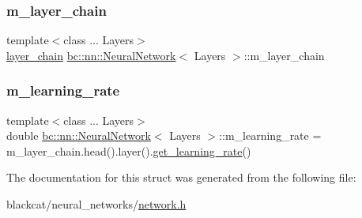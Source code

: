 \mbox{\label{structbc_1_1nn_1_1NeuralNetwork_ac53f5c966286089bcf3944374bcabe03}} 
\subsubsection{\texorpdfstring{m\+\_\+layer\+\_\+chain}{m\_layer\_chain}}
{\footnotesize\ttfamily template$<$class ... Layers$>$ \\
\hyperlink{structbc_1_1nn_1_1NeuralNetwork_aa313d17911ed2cfaa9355c2f7a9f6846}{layer\+\_\+chain} \hyperlink{structbc_1_1nn_1_1NeuralNetwork}{bc\+::nn\+::\+Neural\+Network}$<$ Layers $>$\+::m\+\_\+layer\+\_\+chain}

\mbox{\label{structbc_1_1nn_1_1NeuralNetwork_ac2241797a01d34bca13068d9329fd8fe}} 
\subsubsection{\texorpdfstring{m\+\_\+learning\+\_\+rate}{m\_learning\_rate}}
{\footnotesize\ttfamily template$<$class ... Layers$>$ \\
double \hyperlink{structbc_1_1nn_1_1NeuralNetwork}{bc\+::nn\+::\+Neural\+Network}$<$ Layers $>$\+::m\+\_\+learning\+\_\+rate = m\+\_\+layer\+\_\+chain.\+head().layer().\hyperlink{structbc_1_1nn_1_1NeuralNetwork_a05de79606c5922a8bf12aa4b2f5a00b9}{get\+\_\+learning\+\_\+rate}()}



The documentation for this struct was generated from the following file\+:\begin{DoxyCompactItemize}
\item 
blackcat/neural\+\_\+networks/\hyperlink{network_8h}{network.\+h}\end{DoxyCompactItemize}
